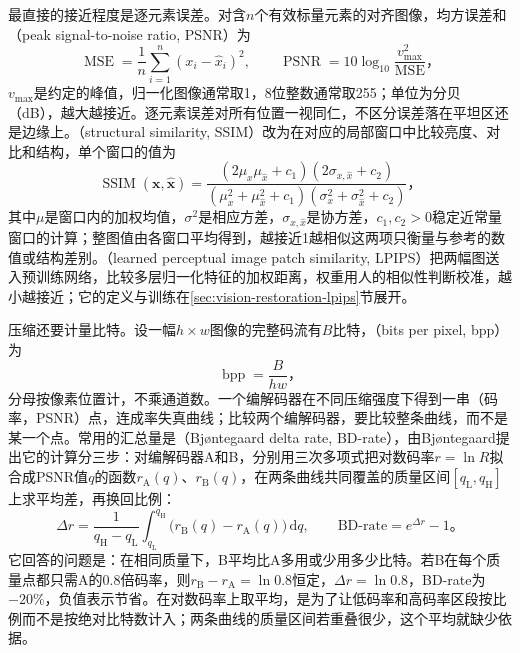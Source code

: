 最直接的接近程度是逐元素误差。对含$n$个有效标量元素的对齐图像，均方误差和（peak signal-to-noise ratio, PSNR）为
\begin{equation}
 \operatorname{MSE}=\frac1n\sum_{i=1}^{n}(x_i-\hat x_i)^2,
 \qquad
 \operatorname{PSNR}
 =10\log_{10}\frac{v_{\max}^2}{\operatorname{MSE}}\text{，}
 \label{eq:vision-psnr}
\end{equation}
$v_{\max}$是约定的峰值，归一化图像通常取1，8位整数通常取255；单位为分贝（dB），越大越接近。逐元素误差对所有位置一视同仁，不区分误差落在平坦区还是边缘上。（structural similarity, SSIM）改为在对应的局部窗口中比较亮度、对比和结构，单个窗口的值为
\begin{equation}
 \operatorname{SSIM}(\bm{x},\hat{\bm{x}})
 =
 \frac{(2\mu_x\mu_{\hat x}+c_1)(2\sigma_{x,\hat x}+c_2)}
 {(\mu_x^2+\mu_{\hat x}^2+c_1)
  (\sigma_x^2+\sigma_{\hat x}^2+c_2)}\text{，}
 \label{eq:vision-ssim}
\end{equation}
其中$\mu$是窗口内的加权均值，$\sigma^2$是相应方差，$\sigma_{x,\hat x}$是协方差，$c_1,c_2>0$稳定近常量窗口的计算；整图值由各窗口平均得到，越接近1越相似这两项只衡量与参考的数值或结构差别。（learned perceptual image patch similarity, LPIPS）把两幅图送入预训练网络，比较多层归一化特征的加权距离，权重用人的相似性判断校准，越小越接近；它的定义与训练在\ref{sec:vision-restoration-lpips}节展开。

压缩还要计量比特。设一幅$h\times w$图像的完整码流有$B$比特，（bits per pixel, bpp）为
\begin{equation}
 \operatorname{bpp}=\frac{B}{hw}\text{，}
 \label{eq:vision-bpp}
\end{equation}
分母按像素位置计，不乘通道数。一个编解码器在不同压缩强度下得到一串（码率，PSNR）点，连成率失真曲线；比较两个编解码器，要比较整条曲线，而不是某一个点。常用的汇总量是（Bjøntegaard delta rate, BD-rate），由Bjøntegaard提出它的计算分三步：对编解码器A和B，分别用三次多项式把对数码率$r=\ln R$拟合成PSNR值$q$的函数$r_{\mathrm{A}}(q)$、$r_{\mathrm{B}}(q)$，在两条曲线共同覆盖的质量区间$[q_{\mathrm{L}},q_{\mathrm{H}}]$上求平均差，再换回比例：
\begin{equation}
 \Delta r=\frac{1}{q_{\mathrm{H}}-q_{\mathrm{L}}}
 \int_{q_{\mathrm{L}}}^{q_{\mathrm{H}}}
 \bigl(r_{\mathrm{B}}(q)-r_{\mathrm{A}}(q)\bigr)\,\mathrm{d}q,
 \qquad
 \text{BD-rate}=e^{\Delta r}-1\text{。}
 \label{eq:vision-bd-rate}
\end{equation}
它回答的问题是：在相同质量下，B平均比A多用或少用多少比特。若B在每个质量点都只需A的0.8倍码率，则$r_{\mathrm{B}}-r_{\mathrm{A}}=\ln0.8$恒定，$\Delta r=\ln0.8$，BD-rate为$-20\%$，负值表示节省。在对数码率上取平均，是为了让低码率和高码率区段按比例而不是按绝对比特数计入；两条曲线的质量区间若重叠很少，这个平均就缺少依据。

